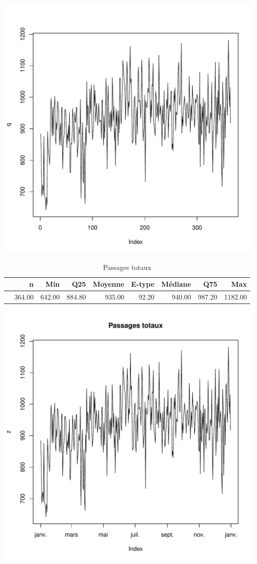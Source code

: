 \documentclass[12pt,english,french,twoside]{book}\usepackage[]{graphicx}\usepackage[]{color}
\makeatletter
\def\maxwidth{ %
  \ifdim\Gin@nat@width>\linewidth
    \linewidth
  \else
    \Gin@nat@width
  \fi
}
\makeatother
\begin{document}
\includegraphics[width=\maxwidth]{figure/passages_totaux1} 
\begin{table}[ht]
\centering
\begin{tabular}{rrrrrrrrr}
  \hline
 & n & Min & Q25 & Moyenne & E-type & Médiane & Q75 & Max \\ 
  \hline
 & 364.00 & 642.00 & 884.80 & 935.00 & 92.20 & 940.00 & 987.20 & 1182.00 \\ 
   \hline
\end{tabular}
\caption[Passages totaux]{Passages totaux} 
\label{tab:pt}
\end{table}

\includegraphics[width=\maxwidth]{figure/passages_totaux2} 
\end{document}
